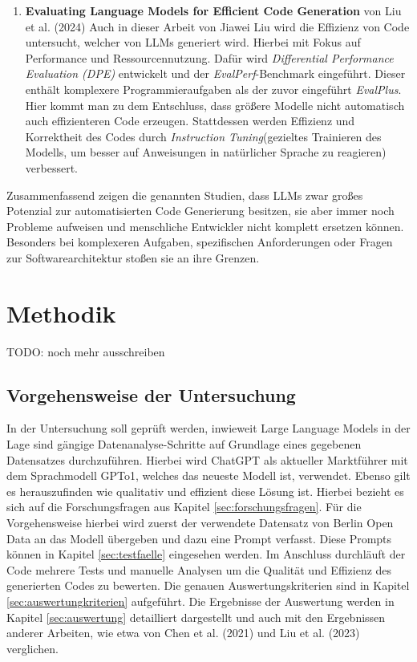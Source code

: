 \documentclass[11pt,a4paper]{article}
\begin{document}
\begin{enumerate}
    \item \textbf{Evaluating Language Models for Efficient Code Generation} von Liu et al. (2024) \cite{liu2024evaluating}
    Auch in dieser Arbeit von Jiawei Liu wird die Effizienz von Code untersucht, welcher von LLMs generiert wird. Hierbei mit Fokus auf Performance und Ressourcennutzung. Dafür wird \emph{Differential Performance Evaluation (DPE)} entwickelt und der \emph{EvalPerf}-Benchmark eingeführt. Dieser enthält komplexere Programmieraufgaben als der zuvor eingeführt \emph{EvalPlus}. Hier kommt man zu dem Entschluss, dass größere Modelle nicht automatisch auch effizienteren Code erzeugen. Stattdessen werden Effizienz und Korrektheit des Codes durch \emph{Instruction Tuning}(gezieltes Trainieren des Modells, um besser auf Anweisungen in natürlicher Sprache zu reagieren) verbessert.
\end{enumerate}
Zusammenfassend zeigen die genannten Studien, dass LLMs zwar großes Potenzial zur automatisierten Code Generierung besitzen, sie aber immer noch Probleme aufweisen und menschliche Entwickler nicht komplett ersetzen können. Besonders bei komplexeren Aufgaben, spezifischen Anforderungen oder Fragen zur Softwarearchitektur stoßen sie an ihre Grenzen.

\section{Methodik}
\label{sec:methodik}
TODO: noch mehr ausschreiben

\subsection{Vorgehensweise der Untersuchung}
    In der Untersuchung soll geprüft werden, inwieweit Large Language Models in der Lage sind gängige Datenanalyse-Schritte auf Grundlage eines gegebenen Datensatzes durchzuführen. Hierbei wird ChatGPT als aktueller Marktführer mit dem Sprachmodell GPTo1, welches das neueste Modell ist, verwendet. Ebenso gilt es herauszufinden wie qualitativ und effizient diese Lösung ist. Hierbei bezieht es sich auf die Forschungsfragen aus Kapitel \ref{sec:forschungsfragen}.
    Für die Vorgehensweise hierbei wird zuerst der verwendete Datensatz von Berlin Open Data an das Modell übergeben und dazu eine Prompt verfasst. Diese Prompts können in Kapitel \ref{sec:testfaelle} eingesehen werden.
    Im Anschluss durchläuft der Code mehrere Tests und manuelle Analysen um die Qualität und Effizienz des generierten Codes zu bewerten. Die genauen Auswertungskriterien sind in Kapitel \ref{sec:auswertungkriterien} aufgeführt.
    Die Ergebnisse der Auswertung werden in Kapitel \ref{sec:auswertung} detailliert dargestellt und auch mit den Ergebnissen anderer Arbeiten, wie etwa von Chen et al. (2021)\cite{chen2021evaluatinglargelanguagemodels} und Liu et al. (2023)\cite{NEURIPS2023_43e9d647} verglichen.
\end{document}
